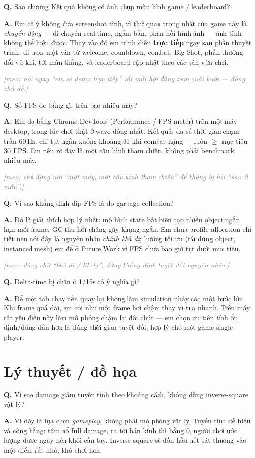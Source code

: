 \documentclass[12pt,a4paper]{article}
\newcommand{\QA}[2]{%
  \par\medskip\noindent\textbf{\textcolor{blue!60!black}{Q.}} #1\par
  \smallskip\noindent\textbf{\textcolor{green!45!black}{A.}} #2\par}
\newcommand{\tip}[1]{\par\smallskip\noindent%
  \textit{\textcolor{gray}{[mẹo: #1]}}\par}
\begin{document}
\QA{Sao chương Kết quả không có ảnh chụp màn hình game / leaderboard?}
{Em cố ý không đưa screenshot tĩnh, vì thứ quan trọng nhất của game này là
\emph{chuyển động} --- di chuyển real-time, ngắm bắn, phản hồi hình ảnh --- ảnh
tĩnh không thể hiện được. Thay vào đó em trình diễn \textbf{trực tiếp} ngay sau
phần thuyết trình: đi trọn một ván từ welcome, countdown, combat, Big Shot, phần
thưởng đổi vũ khí, tới màn thắng, và leaderboard cập nhật theo các ván vừa chơi.}
\tip{nói ngay ``em sẽ demo trực tiếp'' rồi mời hội đồng xem cuối buổi --- đóng chủ đề.}

\QA{Số FPS đo bằng gì, trên bao nhiêu máy?}
{Em đo bằng Chrome DevTools (Performance / FPS meter) trên một máy desktop, trong
lúc chơi thật ở wave đông nhất. Kết quả: đa số thời gian chạm trần 60\,Hz, chỉ tụt
ngắn xuống khoảng 31 khi combat nặng --- luôn $\ge$ mục tiêu 30 FPS. Em nêu rõ đây
là một cấu hình tham chiếu, không phải benchmark nhiều máy.}
\tip{chủ động nói ``một máy, một cấu hình tham chiếu'' để không bị hỏi ``sao ít mẫu''.}

\QA{Vì sao khẳng định dip FPS là do garbage collection?}
{Đó là giải thích hợp lý nhất: mô hình state bất biến tạo nhiều object ngắn hạn mỗi
frame, GC thu hồi chúng gây khựng ngắn. Em chưa profile allocation chi tiết nên nói
đây là nguyên nhân \emph{chính khả dĩ}; hướng tối ưu (tái dùng object, instanced
mesh) em để ở Future Work vì FPS chưa bao giờ tụt dưới mục tiêu.}
\tip{dùng chữ ``khả dĩ / likely'', đừng khẳng định tuyệt đối nguyên nhân.}

\QA{Delta-time bị chặn ở 1/15s có ý nghĩa gì?}
{Để một tab chạy nền quay lại không làm simulation nhảy cóc một bước lớn. Khi frame
quá dài, em coi như một frame hơi chậm thay vì tua nhanh. Trên máy rất yếu điều này
làm mô phỏng chậm lại đôi chút --- em chọn ưu tiên tính ổn định/đúng đắn hơn là
đúng thời gian tuyệt đối, hợp lý cho một game single-player.}

\section{Lý thuyết / đồ họa}

\QA{Vì sao damage giảm tuyến tính theo khoảng cách, không dùng inverse-square vật lý?}
{Vì đây là lựa chọn \emph{gameplay}, không phải mô phỏng vật lý. Tuyến tính dễ hiểu
và công bằng: tâm nổ full damage, ra tới bán kính thì bằng 0, người chơi ước lượng
được ngay nên khỏi cần tay. Inverse-square sẽ dồn hầu hết sát thương vào một điểm
rất nhỏ, khó chơi hơn.}
\end{document}
